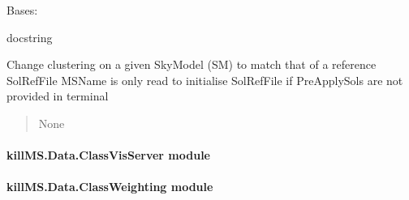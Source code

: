 \documentclass[letterpaper,10pt,english]{sphinxmanual}
\begin{document}
\begin{fulllineitems}
\label{\detokenize{api/killMS.Data:killMS.Data.ClassReCluster.ClassReCluster}}
\pysigstartsignatures
{}
\pysigstopsignatures
\sphinxAtStartPar
Bases: 

\sphinxAtStartPar
docstring

\begin{fulllineitems}
\label{\detokenize{api/killMS.Data:killMS.Data.ClassReCluster.ClassReCluster.ReClusterSkyModel}}
\pysigstartsignatures
{}
\pysigstopsignatures
\sphinxAtStartPar
Change clustering on a given SkyModel (SM) to match that of a reference SolRefFile
MSName is only read to initialise SolRefFile if PreApplySols are not provided in terminal
\begin{quote}\begin{description}
\sphinxAtStartPar
None

\end{description}\end{quote}

\end{fulllineitems}


\end{fulllineitems}



\paragraph{killMS.Data.ClassVisServer module}
\label{\detokenize{api/killMS.Data:killms-data-classvisserver-module}}

\paragraph{killMS.Data.ClassWeighting module}
\label{\detokenize{api/killMS.Data:killms-data-classweighting-module}}
\end{document}
